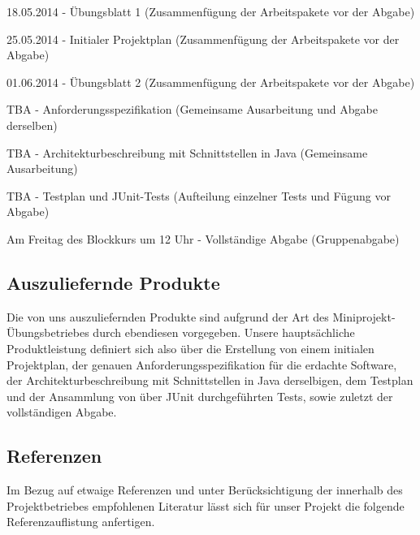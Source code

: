 \documentclass[fontsize=12pt,paper=a4,twoside]{scrartcl}
\begin{document}
18.05.2014 - Übungsblatt 1 (Zusammenfügung der Arbeitspakete vor der Abgabe)

25.05.2014 - Initialer Projektplan (Zusammenfügung der Arbeitspakete vor der Abgabe)

01.06.2014 - Übungsblatt 2 (Zusammenfügung der Arbeitspakete vor der Abgabe)

TBA - Anforderungsspezifikation (Gemeinsame Ausarbeitung und Abgabe derselben)

TBA - Architekturbeschreibung mit Schnittstellen in Java (Gemeinsame Ausarbeitung)

TBA - Testplan und JUnit-Tests (Aufteilung einzelner Tests und Fügung vor Abgabe)

Am Freitag des Blockkurs um 12 Uhr - Vollständige Abgabe (Gruppenabgabe)

\subsection{Auszuliefernde Produkte}

Die von uns auszuliefernden Produkte sind aufgrund der Art des Miniprojekt-Übungsbetriebes durch ebendiesen vorgegeben.\newline
Unsere hauptsächliche Produktleistung definiert sich also über die Erstellung von einem initialen Projektplan, der genauen Anforderungsspezifikation für die erdachte Software, der Architekturbeschreibung mit Schnittstellen in Java derselbigen, dem Testplan und der Ansammlung von über JUnit durchgeführten Tests, sowie zuletzt der vollständigen Abgabe.

\subsection{Referenzen}
%
%
%
%

{\renewcommand\section[2]{}
	
}

Im Bezug auf etwaige Referenzen und unter Berücksichtigung der innerhalb des Projektbetriebes empfohlenen Literatur lässt sich für unser Projekt die folgende Referenzauflistung anfertigen.\newline
\end{document}
